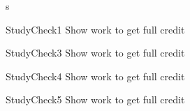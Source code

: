 \documentclass[a4paper,8pt]{book}
\begin{document}
\begin{exam}{s}
\begin{verA}
%
%

   \begin{problem*}{StudyCheck1}{ Show work to get full credit}\vspace{1cm}  
\begin{solution}[1.0in]\end{solution}
\end{problem*}
   \begin{problem*}{StudyCheck3}{ Show work to get full credit}\vspace{1cm}  
\begin{solution}[1.0in]\end{solution}
\end{problem*}
   \begin{problem*}{StudyCheck4}{ Show work to get full credit}\vspace{1cm}  
\begin{solution}[1.0in]\end{solution}
\end{problem*}
   \begin{problem*}{StudyCheck5}{ Show work to get full credit}\vspace{1cm}  
\begin{solution}[1.0in]\end{solution}
\end{problem*}

\end{verA}
\end{exam}
\end{document}
